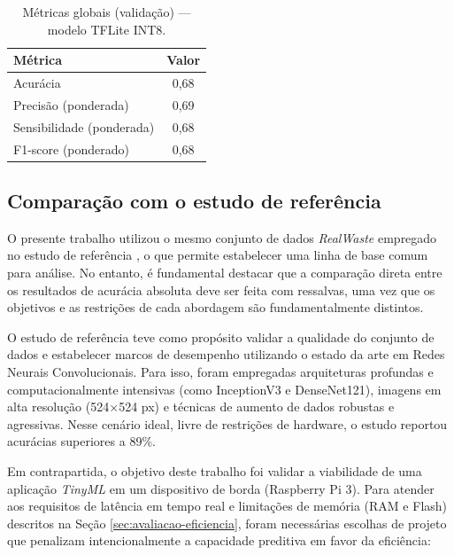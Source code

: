 \documentclass[repeatfields,xlists,xpacks,oneside]{ufrgscca}
\begin{document}
\begin{table}[H]
    \begin{center}
        \caption{Métricas globais (validação) — modelo TFLite INT8.}
        \label{tab:metricas_globais}
        \begin{tabular}{l c}
            \hline
            \textbf{Métrica} & \textbf{Valor} \\
            \hline
            Acurácia & 0,68 \\
            Precisão (ponderada) & 0,69 \\
            Sensibilidade (ponderada) & 0,68 \\
            F1-score (ponderado) & 0,68 \\
            \hline
        \end{tabular}
    \end{center}
    {}
\end{table}

\subsection{Comparação com o estudo de referência}

O presente trabalho utilizou o mesmo conjunto de dados \textit{RealWaste} empregado no estudo de referência \cite{single2023realwaste}, o que permite estabelecer uma linha de base comum para análise. No entanto, é fundamental destacar que a comparação direta entre os resultados de acurácia absoluta deve ser feita com ressalvas, uma vez que os objetivos e as restrições de cada abordagem são fundamentalmente distintos.

O estudo de referência teve como propósito validar a qualidade do conjunto de dados e estabelecer marcos de desempenho utilizando o estado da arte em Redes Neurais Convolucionais. Para isso, foram empregadas arquiteturas profundas e computacionalmente intensivas (como InceptionV3 e DenseNet121), imagens em alta resolução (524$\times$524 px) e técnicas de aumento de dados robustas e agressivas. Nesse cenário ideal, livre de restrições de hardware, o estudo reportou acurácias superiores a 89\%.

Em contrapartida, o objetivo deste trabalho foi validar a viabilidade de uma aplicação \textit{TinyML} em um dispositivo de borda (Raspberry Pi 3). Para atender aos requisitos de latência em tempo real e limitações de memória (RAM e Flash) descritos na Seção \ref{sec:avaliacao-eficiencia}, foram necessárias escolhas de projeto que penalizam intencionalmente a capacidade preditiva em favor da eficiência:
\end{document}
